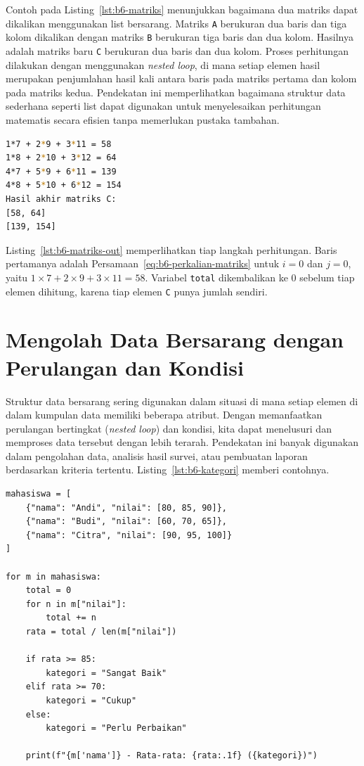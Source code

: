 Contoh pada Listing~\ref{lst:b6-matriks} menunjukkan bagaimana dua matriks dapat dikalikan menggunakan list bersarang. 
Matriks \texttt{A} berukuran dua baris dan tiga kolom dikalikan dengan matriks \texttt{B} berukuran tiga baris dan dua kolom. 
Hasilnya adalah matriks baru \texttt{C} berukuran dua baris dan dua kolom. 
Proses perhitungan dilakukan dengan menggunakan \textit{nested loop}, 
di mana setiap elemen hasil merupakan penjumlahan hasil kali antara baris pada matriks pertama dan kolom pada matriks kedua. 
Pendekatan ini memperlihatkan bagaimana struktur data sederhana seperti list dapat digunakan untuk menyelesaikan perhitungan matematis secara efisien tanpa memerlukan pustaka tambahan.

\begin{lstlisting}[language=bash, caption={Keluaran kode perkalian matriks}, label={lst:b6-matriks-out}]
1*7 + 2*9 + 3*11 = 58
1*8 + 2*10 + 3*12 = 64
4*7 + 5*9 + 6*11 = 139
4*8 + 5*10 + 6*12 = 154
Hasil akhir matriks C:
[58, 64]
[139, 154]
\end{lstlisting}

Listing~\ref{lst:b6-matriks-out} memperlihatkan tiap langkah perhitungan. Baris pertamanya adalah Persamaan~\eqref{eq:b6-perkalian-matriks} untuk $i = 0$ dan $j = 0$, yaitu $1 \times 7 + 2 \times 9 + 3 \times 11 = 58$. Variabel \texttt{total} dikembalikan ke 0 sebelum tiap elemen dihitung, karena tiap elemen \texttt{C} punya jumlah sendiri.

\section{Mengolah Data Bersarang dengan Perulangan dan Kondisi}
Struktur data bersarang sering digunakan dalam situasi di mana setiap elemen di dalam kumpulan data memiliki beberapa atribut. 
Dengan memanfaatkan perulangan bertingkat (\textit{nested loop}) dan kondisi, kita dapat menelusuri dan memproses data tersebut dengan lebih terarah. 
Pendekatan ini banyak digunakan dalam pengolahan data, analisis hasil survei, atau pembuatan laporan berdasarkan kriteria tertentu. Listing~\ref{lst:b6-kategori} memberi contohnya.

\begin{lstlisting}[style=PythonStyle, caption={Menentukan kategori nilai dari data bersarang}, label={lst:b6-kategori}]
mahasiswa = [
    {"nama": "Andi", "nilai": [80, 85, 90]},
    {"nama": "Budi", "nilai": [60, 70, 65]},
    {"nama": "Citra", "nilai": [90, 95, 100]}
]

for m in mahasiswa:
    total = 0
    for n in m["nilai"]:
        total += n
    rata = total / len(m["nilai"])
    
    if rata >= 85:
        kategori = "Sangat Baik"
    elif rata >= 70:
        kategori = "Cukup"
    else:
        kategori = "Perlu Perbaikan"
    
    print(f"{m['nama']} - Rata-rata: {rata:.1f} ({kategori})")
\end{lstlisting}

